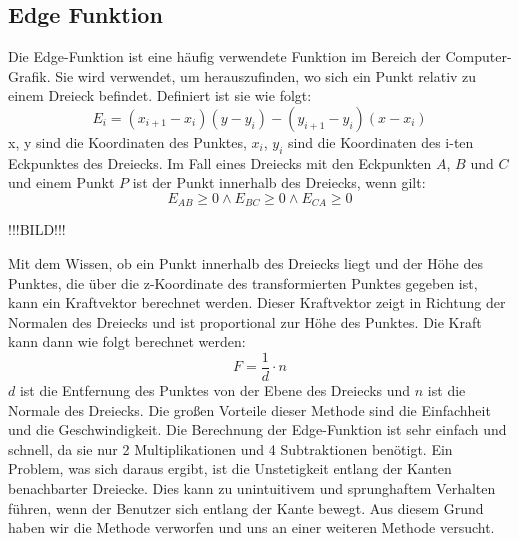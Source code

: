 \documentclass[conference]{IEEEtran}
\begin{document}
\subsection{Edge Funktion}
Die Edge-Funktion ist eine häufig verwendete Funktion im Bereich der Computer-Grafik. Sie wird verwendet, um herauszufinden, wo sich ein Punkt relativ zu einem Dreieck befindet. Definiert ist sie wie folgt:
\begin{equation}
    E_{i} = (x_{i+1} - x_{i})(y - y_{i}) - (y_{i+1} - y_{i})(x - x_{i})
\end{equation}
x, y sind die Koordinaten des Punktes, $x_{i}$, $y_{i}$ sind die Koordinaten des i-ten Eckpunktes des Dreiecks.
Im Fall eines Dreiecks mit den Eckpunkten $A$, $B$ und $C$ und einem Punkt $P$ ist der Punkt innerhalb des Dreiecks, wenn gilt:
\begin{equation}
    E_{AB} \geq 0 \land E_{BC} \geq 0 \land E_{CA} \geq 0
\end{equation}

!!!BILD!!!

Mit dem Wissen, ob ein Punkt innerhalb des Dreiecks liegt und der Höhe des Punktes, die über die z-Koordinate des transformierten Punktes gegeben ist, kann ein Kraftvektor berechnet werden. Dieser Kraftvektor zeigt in Richtung der Normalen des Dreiecks und ist proportional zur Höhe des Punktes. Die Kraft kann dann wie folgt berechnet werden:
\begin{equation}
    F = \frac{1}{d} \cdot n
\end{equation}
$d$ ist die Entfernung des Punktes von der Ebene des Dreiecks und $n$ ist die Normale des Dreiecks.
Die großen Vorteile dieser Methode sind die Einfachheit und die Geschwindigkeit. Die Berechnung der Edge-Funktion ist sehr einfach und schnell, da sie nur 2 Multiplikationen und 4 Subtraktionen benötigt.
Ein Problem, was sich daraus ergibt, ist die Unstetigkeit entlang der Kanten benachbarter Dreiecke. Dies kann zu unintuitivem und sprunghaftem Verhalten führen, wenn der Benutzer sich entlang der Kante bewegt. Aus diesem Grund haben wir die Methode verworfen und uns an einer weiteren Methode versucht.
\end{document}
